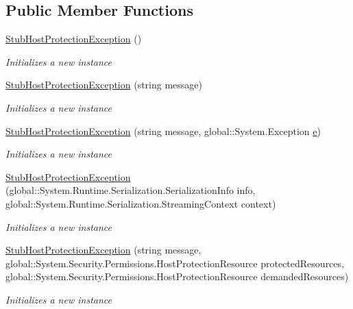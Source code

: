 \subsection*{Public Member Functions}
\begin{DoxyCompactItemize}
\item 
\hyperlink{class_system_1_1_security_1_1_fakes_1_1_stub_host_protection_exception_abba1af54de59c1e950b0fb0b9cb2a6de}{Stub\-Host\-Protection\-Exception} ()
\begin{DoxyCompactList}\small\item\em Initializes a new instance\end{DoxyCompactList}\item 
\hyperlink{class_system_1_1_security_1_1_fakes_1_1_stub_host_protection_exception_a7087d391be616ff5173785d330a04ba0}{Stub\-Host\-Protection\-Exception} (string message)
\begin{DoxyCompactList}\small\item\em Initializes a new instance\end{DoxyCompactList}\item 
\hyperlink{class_system_1_1_security_1_1_fakes_1_1_stub_host_protection_exception_aea361612c7e5027b54b60c291537f65e}{Stub\-Host\-Protection\-Exception} (string message, global\-::\-System.\-Exception \hyperlink{jquery-1_810_82_8min_8js_a2c038346d47955cbe2cb91e338edd7e1}{e})
\begin{DoxyCompactList}\small\item\em Initializes a new instance\end{DoxyCompactList}\item 
\hyperlink{class_system_1_1_security_1_1_fakes_1_1_stub_host_protection_exception_acf2c6bd8d8255a51e6fbb34d11386d8c}{Stub\-Host\-Protection\-Exception} (global\-::\-System.\-Runtime.\-Serialization.\-Serialization\-Info info, global\-::\-System.\-Runtime.\-Serialization.\-Streaming\-Context context)
\begin{DoxyCompactList}\small\item\em Initializes a new instance\end{DoxyCompactList}\item 
\hyperlink{class_system_1_1_security_1_1_fakes_1_1_stub_host_protection_exception_acc6c901659a65d2803e3e3710da4d20f}{Stub\-Host\-Protection\-Exception} (string message, global\-::\-System.\-Security.\-Permissions.\-Host\-Protection\-Resource protected\-Resources, global\-::\-System.\-Security.\-Permissions.\-Host\-Protection\-Resource demanded\-Resources)
\begin{DoxyCompactList}\small\item\em Initializes a new instance\end{DoxyCompactList}\item 

\end{DoxyCompactItemize}
